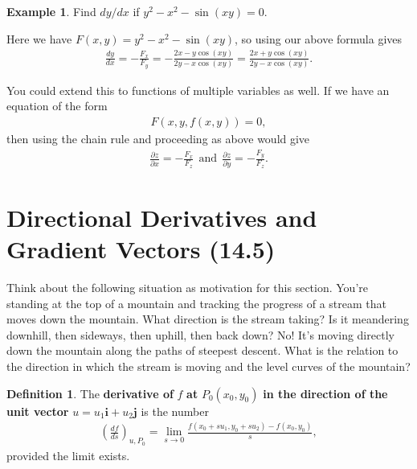 \documentclass[12pt, letter]{article}
\theoremstyle{plain}
\numberwithin{theorem}{section}
\theoremstyle{definition}
\newtheorem{definition}[theorem]{Definition}
\newtheorem{example}[theorem]{Example}
\begin{document}
\bigskip

\hrulefill

\bigskip

\begin{example}
Find $dy/dx$ if $y^2-x^2-\sin(xy) = 0$.

\smallskip

Here we have $F(x,y) = y^2-x^2-\sin(xy)$, so using our above formula gives
\begin{align*}
\frac{dy}{dx} = -\frac{F_x}{F_y} = -\frac{2x-y\cos(xy)}{2y-x\cos(xy)} = \frac{2x+y\cos(xy)}{2y-x\cos(xy)}.
\end{align*}
\end{example}

\bigskip

\hrulefill

\bigskip

You could extend this to functions of multiple variables as well. If we have an equation of the form
\begin{align*}
F(x,y,f(x,y))=0,
\end{align*}
then using the chain rule and proceeding as above would give
\begin{align*}
\frac{\partial z}{\partial x} = -\frac{F_x}{F_z} \ \ \text{and} \ \ \frac{\partial z}{\partial y} = -\frac{F_y}{F_z}.
\end{align*}

\newpage


\section{Directional Derivatives and Gradient Vectors (14.5)}

Think about the following situation as motivation for this section. You're standing at the top of a mountain and tracking the progress of a stream that moves down the mountain. What direction is the stream taking? Is it meandering downhill, then sideways, then uphill, then back down? No! It's moving directly down the mountain along the paths of steepest descent. What is the relation to the direction in which the stream is moving and the level curves of the mountain?

\bigskip

\begin{definition}
The \textbf{derivative of} $f$ \textbf{at} $P_0(x_0,y_0)$ \textbf{in the direction of the unit vector} $u = u_1 \bm{i} + u_2 \bm{j}$ is the number
\begin{align*}
\left(\frac{df}{ds}\right)_{u,P_0} = \lim_{s\to 0} \frac{f(x_0+su_1, y_0 + su_2) - f(x_0,y_0)}{s},
\end{align*}
provided the limit exists.
\end{definition}
\end{document}
